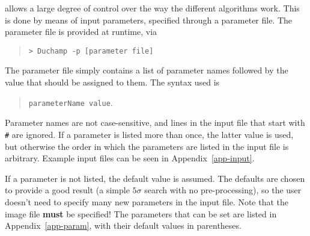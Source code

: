 %
%
%
%

\label{sec-param}

\duchamp allows a large degree of control over the way the different
algorithms work. This is done by means of input parameters, specified
through a parameter file. The parameter file is provided at runtime,
via
\begin{quote}
{\footnotesize
\texttt{> Duchamp -p [parameter file]}
}
\end{quote}
The parameter file simply contains a list of parameter names followed
by the value that should be assigned to them. The syntax used is 
\begin{quote}
\texttt{parameterName value}.
\end{quote}
Parameter names are not case-sensitive, and lines in the input
file that start with \texttt{\#} are ignored. If a parameter is listed
more than once, the latter value is used, but otherwise the order in
which the parameters are listed in the input file is
arbitrary. Example input files can be seen in
Appendix~\ref{app-input}.

If a parameter is not listed, the default value is assumed. The
defaults are chosen to provide a good result (a simple $5\sigma$
search with no pre-processing), so the user doesn't need to specify
many new parameters in the input file. Note that the image file
\textbf{must} be specified!  The parameters that can be set are listed
in Appendix~\ref{app-param}, with their default values in parentheses.

